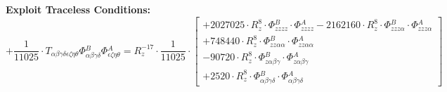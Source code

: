 \documentclass{article}
\begin{document}
\textbf{Exploit Traceless Conditions:}
\begin{equation}
+ \frac{1}{11025} \cdot T_{\alpha{}\beta{}\gamma{}\delta{}\epsilon{}\zeta{}\eta{}\theta{}} \Phi{}^{B}_{\alpha{}\beta{}\gamma{}\delta{}} \Phi{}^{A}_{\epsilon{}\zeta{}\eta{}\theta{}} = R_{z}^{-17} \cdot \frac{1}{11025} \cdot  \left[ \begin{array}{c} 
 		+ 2027025 \cdot R_{z}^{8} \cdot \Phi{}^{B}_{zzzz} \cdot \Phi{}^{A}_{zzzz}- 2162160 \cdot R_{z}^{8} \cdot \Phi{}^{B}_{zzz\alpha{}} \cdot \Phi{}^{A}_{zzz\alpha{}} 
 \\[0.2em] 		 + 748440 \cdot R_{z}^{8} \cdot \Phi{}^{B}_{zz\alpha{}\alpha{}} \cdot \Phi{}^{A}_{zz\alpha{}\alpha{}} 
 \\[0.2em] 		 - 90720 \cdot R_{z}^{8} \cdot \Phi{}^{B}_{z\alpha{}\beta{}\gamma{}} \cdot \Phi{}^{A}_{z\alpha{}\beta{}\gamma{}} 
 \\[0.2em] 		 + 2520 \cdot R_{z}^{8} \cdot \Phi{}^{B}_{\alpha{}\beta{}\gamma{}\delta{}} \cdot \Phi{}^{A}_{\alpha{}\beta{}\gamma{}\delta{}}
 \end{array}\right] 
\end{equation}
\end{document}
